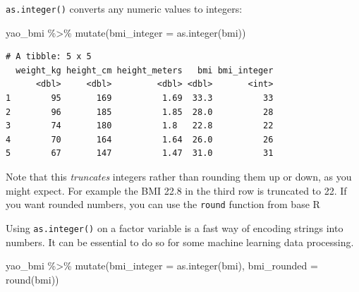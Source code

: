 \documentclass[
  letterpaper,
  DIV=11,
  numbers=noendperiod]{scrreprt}
\newenvironment{Shaded}{\begin{snugshade}}{\end{snugshade}}
\newcommand{\AttributeTok}[1]{\textcolor[rgb]{0.40,0.45,0.13}{#1}}
\newcommand{\FunctionTok}[1]{\textcolor[rgb]{0.28,0.35,0.67}{#1}}
\newcommand{\NormalTok}[1]{\textcolor[rgb]{0.00,0.23,0.31}{#1}}
\newcommand{\SpecialCharTok}[1]{\textcolor[rgb]{0.37,0.37,0.37}{#1}}
\begin{document}
\texttt{as.integer()} converts any numeric values to integers:

\begin{Shaded}
\begin{Highlighting}[]
\NormalTok{yao\_bmi }\SpecialCharTok{\%\textgreater{}\%} 
  \FunctionTok{mutate}\NormalTok{(}\AttributeTok{bmi\_integer =} \FunctionTok{as.integer}\NormalTok{(bmi))}
\end{Highlighting}
\end{Shaded}

\begin{verbatim}
# A tibble: 5 x 5
  weight_kg height_cm height_meters   bmi bmi_integer
      <dbl>     <dbl>         <dbl> <dbl>       <int>
1        95       169          1.69  33.3          33
2        96       185          1.85  28.0          28
3        74       180          1.8   22.8          22
4        70       164          1.64  26.0          26
5        67       147          1.47  31.0          31
\end{verbatim}

Note that this \emph{truncates} integers rather than rounding them up or
down, as you might expect. For example the BMI 22.8 in the third row is
truncated to 22. If you want rounded numbers, you can use the
\texttt{round} function from base R

\begin{tcolorbox}[enhanced jigsaw, title=\textcolor{quarto-callout-note-color}{\faInfo}\hspace{0.5em}{Pro Tip}, colbacktitle=quarto-callout-note-color!10!white, leftrule=.75mm, arc=.35mm, opacityback=0, bottomrule=.15mm, rightrule=.15mm, toptitle=1mm, breakable, toprule=.15mm, colback=white, coltitle=black, colframe=quarto-callout-note-color-frame, bottomtitle=1mm, titlerule=0mm, left=2mm, opacitybacktitle=0.6]

Using \texttt{as.integer()} on a factor variable is a fast way of
encoding strings into numbers. It can be essential to do so for some
machine learning data processing.

\end{tcolorbox}

\begin{Shaded}
\begin{Highlighting}[]
\NormalTok{yao\_bmi }\SpecialCharTok{\%\textgreater{}\%} 
  \FunctionTok{mutate}\NormalTok{(}\AttributeTok{bmi\_integer =} \FunctionTok{as.integer}\NormalTok{(bmi), }
         \AttributeTok{bmi\_rounded =} \FunctionTok{round}\NormalTok{(bmi)) }
\end{Highlighting}
\end{Shaded}
\end{document}

